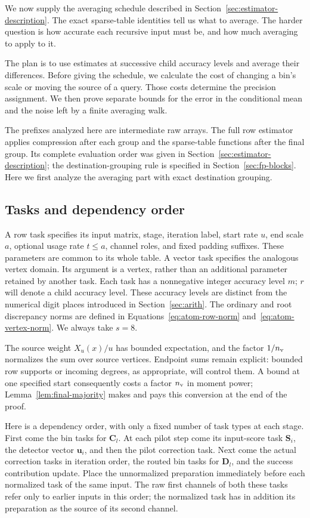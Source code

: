 \documentclass[11pt]{article}
\numberwithin{equation}{section}
\theoremstyle{definition}
\theoremstyle{remark}
\begin{document}
We now supply the averaging schedule described in Section~\ref{sec:estimator-description}. The exact sparse-table identities tell us what to average. The harder question is how accurate each recursive input must be, and how much averaging to apply to it.

The plan is to use estimates at successive child accuracy levels and average their differences. Before giving the schedule, we calculate the cost of changing a bin's scale or moving the source of a query. Those costs determine the precision assignment. We then prove separate bounds for the error in the conditional mean and the noise left by a finite averaging walk.

The prefixes analyzed here are intermediate raw arrays. The full row estimator applies compression after each group and the sparse-table functions after the final group. Its complete evaluation order was given in Section~\ref{sec:estimator-description}; the destination-grouping rule is specified in Section~\ref{sec:fp-blocks}. Here we first analyze the averaging part with exact destination grouping.

\subsection{Tasks and dependency order}

A row task specifies its input matrix, stage, iteration label, start rate
$u$, end scale $a$, optional usage rate $t\le a$, channel roles, and fixed
padding suffixes.  These parameters are common to its whole table.  A
vector task specifies the analogous vertex domain.  Its argument is a
vertex, rather than an additional parameter retained by another task.
Each task has a nonnegative integer accuracy level ${m}$; ${r}$ will
denote a child accuracy level.  These accuracy levels are distinct from the numerical
digit places introduced in Section~\ref{sec:arith}.
The ordinary and root discrepancy norms are defined in
Equations~\eqref{eq:atom-row-norm} and~\eqref{eq:atom-vertex-norm}.
We always take $s=8$.

The source weight $X_u(x)/u$ has bounded expectation, and the factor
$1/{n_{\rm v}}$ normalizes the sum over source vertices.  Endpoint sums remain
explicit: bounded row supports or incoming degrees, as appropriate,
will control them.  A bound at one specified start consequently costs
a factor ${n_{\rm v}}$ in moment power; Lemma~\ref{lem:final-majority} makes and
pays this conversion at the end of the proof.

Here is a dependency order, with only a fixed number of task types at each
stage.  First come the bin tasks for ${\mathbf{C}}_l$.  At each pilot step come its
input-score task ${\mathbf{S}}_i$, the detector vector ${\mathbf{u}}_i$, and then the
pilot correction task.  Next come the actual correction tasks in iteration
order, the routed bin tasks for ${\mathbf{D}}_l$, and the success contribution update.  Place the
unnormalized preparation immediately before each normalized task of the
same input.  The raw first channels of both these tasks refer only to
earlier inputs in this order; the normalized task has in addition its
preparation as the source of its second channel.
\end{document}

